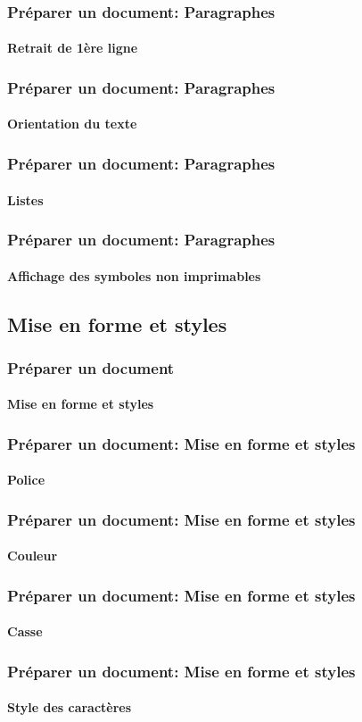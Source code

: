 \documentclass[xcolor=table]{beamer}
\begin{document}
\begin{frame}
\frametitle{Préparer un document: Paragraphes}
\framesubtitle{Retrait de 1ère ligne}

\end{frame}

\begin{frame}
\frametitle{Préparer un document: Paragraphes}
\framesubtitle{Orientation du texte}

\end{frame}

\begin{frame}
\frametitle{Préparer un document: Paragraphes}
\framesubtitle{Listes}

\end{frame}

\begin{frame}
\frametitle{Préparer un document: Paragraphes}
\framesubtitle{Affichage des symboles non imprimables}

\end{frame}


\subsection{Mise en forme et styles}

\begin{frame}
\frametitle{Préparer un document}
\framesubtitle{Mise en forme et styles}

\end{frame}

\begin{frame}
\frametitle{Préparer un document: Mise en forme et styles}
\framesubtitle{Police}

\end{frame}

\begin{frame}
\frametitle{Préparer un document: Mise en forme et styles}
\framesubtitle{Couleur}

\end{frame}

\begin{frame}
\frametitle{Préparer un document: Mise en forme et styles}
\framesubtitle{Casse}

\end{frame}

\begin{frame}
\frametitle{Préparer un document: Mise en forme et styles}
\framesubtitle{Style des caractères}

\end{frame}
\end{document}
